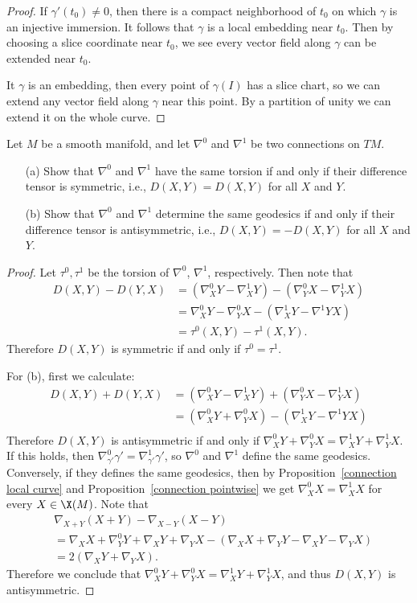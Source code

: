 \begin{proof}
If $\gamma'(t_0)\neq 0$, then there is a compact neighborhood of $t_0$ on which $\gamma$ is an injective immersion. It follows that $\gamma$ is a local embedding near $t_0$. 
Then by choosing a slice coordinate near $t_0$, we see every vector field along $\gamma$ can be extended near $t_0$.\par
It $\gamma$ is an embedding, then every point of $\gamma(I)$ has a slice chart, so we can extend any vector field along $\gamma$ near this point. By a partition of unity 
we can extend it on the whole curve.
\end{proof}
\begin{exercise}
Let $M$ be a smooth manifold, and let $\nabla^0$ and $\nabla^1$ be two connections on $TM$.
\begin{itemize}
\item[(a)] Show that $\nabla^0$ and $\nabla^1$ have the same torsion if and only if their difference tensor is symmetric, i.e., $D(X,Y)=D(X,Y)$ for all $X$ and $Y$.
\item[(b)] Show that $\nabla^0$ and $\nabla^1$ determine the same geodesics if and only if their difference tensor is antisymmetric, i.e., $D(X,Y)=-D(X,Y)$ for all $X$ and $Y$.
\end{itemize}
\end{exercise}
\begin{proof}
Let $\tau^0,\tau^1$ be the torsion of $\nabla^0$, $\nabla^1$, respectively. Then note that
\begin{align*}
D(X,Y)-D(Y,X)&=(\nabla^0_XY-\nabla^1_XY)-(\nabla^0_YX-\nabla^1_YX)\\
&=\nabla^0_XY-\nabla^0_YX-(\nabla^1_XY-\nabla^1YX)\\
&=\tau^0(X,Y)-\tau^1(X,Y).
\end{align*}
Therefore $D(X,Y)$ is symmetric if and only if $\tau^0=\tau^1$.\par
For (b), first we calculate:
\begin{align*}
D(X,Y)+D(Y,X)&=(\nabla^0_XY-\nabla^1_XY)+(\nabla^0_YX-\nabla^1_YX)\\
&=(\nabla^0_XY+\nabla^0_YX)-(\nabla^1_XY-\nabla^1YX)\\
\end{align*}
Therefore $D(X,Y)$ is antisymmetric if and only if $\nabla^0_XY+\nabla^0_YX=\nabla^1_XY+\nabla^1_YX$. If this holds, then 
$\nabla^0_{\gamma'}\gamma'=\nabla^1_{\gamma'}\gamma'$, so $\nabla^0$ and $\nabla^1$ define the same geodesics. Conversely, if they defines the same geodesics, then by 
Proposition~\ref{connection local curve} and Proposition~\ref{connection pointwise} we get $\nabla^0_{X}X=\nabla^1_XX$ for every $X\in\X(M)$. Note that
\begin{align*}
&\nabla_{X+Y}(X+Y)-\nabla_{X-Y}(X-Y)\\
&=\nabla_XX+\nabla^0_YY+\nabla_XY+\nabla_YX-(\nabla_XX+\nabla_YY-\nabla_XY-\nabla_YX)\\
&=2(\nabla_XY+\nabla_YX).
\end{align*}
Therefore we conclude that $\nabla^0_XY+\nabla^0_YX=\nabla^1_XY+\nabla^1_YX$, and thus $D(X,Y)$ is antisymmetric.
\end{proof}
